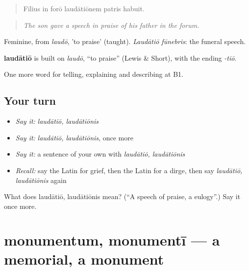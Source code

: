 \begin{quote}
Fīlius in forō laudātiōnem patris habuit.
\end{quote}

\begin{quote}
\emph{The son gave a speech in praise of his father in the forum.}
\end{quote}

Feminine, from \emph{laudō}, 'to praise' (taught). \emph{Laudātiō fūnebris}: the funeral speech.

\begin{cousinweb}
\textbf{laudātiō} is built on \emph{laudō}, \textquotedblleft{}to praise\textquotedblright{} (Lewis \& Short), with the ending \emph{-tiō}.
\end{cousinweb}

\begin{grammarlens}[title={What you've built}]
One more word for telling, explaining and describing at B1.
\end{grammarlens}

\subsection*{Your turn}
\begin{itemize}
\raggedright
  \item \emph{Say it:} \emph{laudātiō, laudātiōnis}
  \item \emph{Say it:} \emph{laudātiō, laudātiōnis}, once more
  \item \emph{Say it:} a sentence of your own with \emph{laudātiō, laudātiōnis}
  \item \emph{Recall:} say the Latin for grief, then the Latin for a dirge, then say \emph{laudātiō, laudātiōnis} again
\end{itemize}

\begin{tcolorbox}[breakable,colback=teal!4,colframe=teal!35!black,title={Before you move on}]
What does laudātiō, laudātiōnis mean? (\textquotedblleft{}A speech of praise, a eulogy\textquotedblright{}.) Say it once more.
\end{tcolorbox}
\section[monumentum, monumentī]{monumentum, monumentī — a memorial, a monument}

\label{lesson:LA-C331-monumentum}



